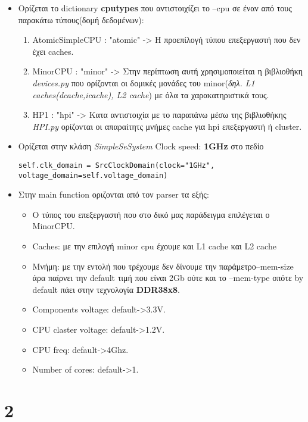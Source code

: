 \documentclass[10pt]{report}
\newcommand{\tu}{\textunderscore}
\begin{document}
\begin{itemize}
\item Ορίζεται το dictionary \textbf{cpu\tu types} που αντιστοιχίζει το --cpu σε έναν από τους παρακάτω τύπους(δομή δεδομένων):
\begin{enumerate}
\item AtomicSimpleCPU : "atomic" -> Η προεπίλογή τύπου επεξεργαστή που δεν έχει caches.
\item MinorCPU : "minor" -> Στην περίπτωση αυτή χρησιμοποιείται η βιβλιοθήκη \textit{devices.py} που ορίζονται οι δομικές μονάδες του minor(\textit{δηλ. L1 caches(dcache,icache), L2 cache}) με όλα τα  χαρακατηριστικά τους.
\item ΗP1 : "hpi" -> Κατα αντιστοιχία με το παραπάνω μέσω της βιβλιοθήκης \textit{HPI.py} ορίζονται οι απαραίτητς μνήμες cache για hpi επεξεργαστή ή cluster.
\end{enumerate}
\item Ορίζεται στην κλάση \textit{SimpleSeSystem} Clock speed: \textbf{1GHz} στο πεδίο \begin{lstlisting}
self.clk_domain = SrcClockDomain(clock="1GHz",
voltage_domain=self.voltage_domain)
\end{lstlisting}
\item Στην main function οριζονται από τον parser τα εξής:
\begin{itemize}
\item Ο τύπος του επεξεργαστή που στο δικό μας παράδειγμα επιλέγεται ο MinorCPU.
\item Caches: με την επιλογή minor cpu έχουμε και L1 cache και L2 cache
\item Μνήμη: με την εντολή που τρέχουμε δεν δίνουμε την παράμετρο--mem-size άρα παίρνει την default τιμή που είναι 2Gb ούτε και το --mem-type οπότε by default πάει στην τεχνολογία \textbf{DDR3\tu1600\tu8x8}.
\item Components voltage: default->3.3V.
\item CPU claster voltage: default->1.2V.
\item CPU freq: default->4Ghz.
\item Number of cores: default->1.
\end{itemize}
\end{itemize}

\section{2}
\end{document}
